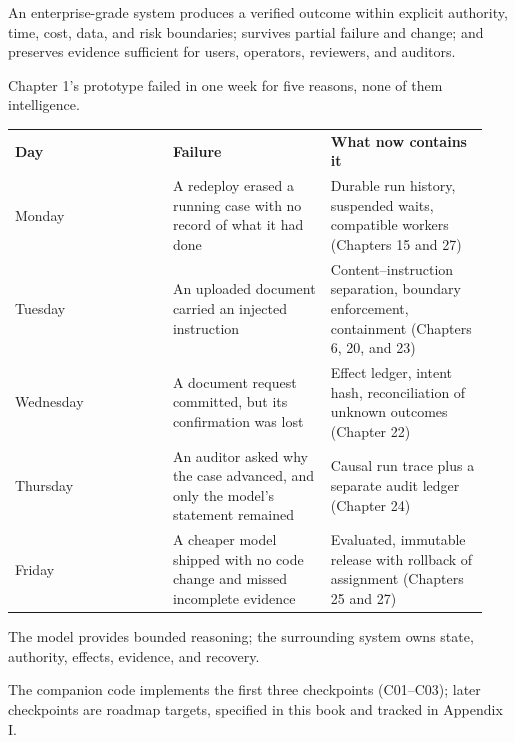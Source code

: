 
\begin{bookcallout}
An enterprise-grade system produces a verified outcome within explicit authority, time, cost, data, and risk boundaries; survives partial failure and change; and preserves evidence sufficient for users, operators, reviewers, and auditors.
\end{bookcallout}

Chapter 1's prototype failed in one week for five reasons, none of them intelligence.\par

\BookTableStart
\small
\begin{tabular}{@{}Y{0.3133\linewidth}Y{0.3133\linewidth}Y{0.3133\linewidth}@{}}
\color{white}\bfseries \textbf{Day} & \color{white}\bfseries \textbf{Failure} & \color{white}\bfseries \textbf{What now contains it} \\
Monday & A redeploy erased a running case with no record of what it had done & Durable run history, suspended waits, compatible workers (Chapters 15 and 27) \\
Tuesday & An uploaded document carried an injected instruction & Content–instruction separation, boundary enforcement, containment (Chapters 6, 20, and 23) \\
Wednesday & A document request committed, but its confirmation was lost & Effect ledger, intent hash, reconciliation of unknown outcomes (Chapter 22) \\
Thursday & An auditor asked why the case advanced, and only the model's statement remained & Causal run trace plus a separate audit ledger (Chapter 24) \\
Friday & A cheaper model shipped with no code change and missed incomplete evidence & Evaluated, immutable release with rollback of assignment (Chapters 25 and 27) \\
\end{tabular}
\BookTableEnd

The model provides bounded reasoning; the surrounding system owns state, authority, effects, evidence, and recovery.\par

The companion code implements the first three checkpoints (C01–C03); later checkpoints are roadmap targets, specified in this book and tracked in Appendix I.\par

